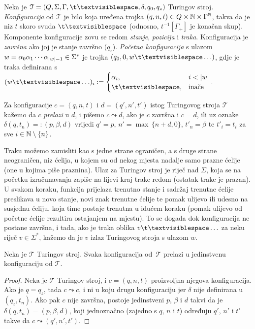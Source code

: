 \begin{definicija}[{name=[Turing-konfiguracije i prijelazi među njima]}]
Neka je $\mathcal T=(Q,\Sigma,\Gamma,\bl,\delta,q_0,q_z)$ Turingov stroj. \emph{Konfiguracija} od $\mathcal T$ je bilo koja uređena trojka $(q,n,t)\in Q\times{\mathbb N}\times\Gamma^{\mathbb N}$, takva da je niz $t$ skoro svuda $\bl$ (odnosno, $t^{-1}[\Gamma_+]$ je konačan skup). Komponente konfiguracije zovu se redom \emph{stanje}, \emph{pozicija} i \emph{traka}. Konfiguracija je \emph{završna} ako joj je stanje završno ($q_z$). \emph{Početna konfiguracija} s ulazom $w=\alpha_0\alpha_1\dotsm\alpha_{\lvert w\rvert-1}\in\Sigma^*$ je trojka $(q_0,0,w\bl\ldots)$, gdje je traka definirana s $(w\bl\ldots)_i:=\begin{cases}
\alpha_i,&i<\dulj{w}\\
\bl,&\text{inače}
\end{cases}$.

Za konfiguracije $c=(q,n,t)$ i $d=(q',n',t')$ istog Turingovog stroja $\mathcal T$ kažemo da $c$ \emph{prelazi} u $d$, i pišemo $c\leadsto d$, ako je $c$ završna i $c=d$, ili uz oznake $\delta(q,t_n)=:(p,\beta,d)$ vrijedi $q'=p$, $n'=\max\,\{n+d,0\}$, $t'_n=\beta$ te $t'_i=t_i$ za sve $i\in{\mathbb N}\setminus\{n\}$.
\end{definicija}

Traku možemo zamisliti kao s jedne strane ograničen, a s druge strane neograničen, niz ćelija, u kojem su od nekog mjesta nadalje samo prazne ćelije (one u kojima piše praznina). Ulaz za Turingov stroj je riječ nad $\Sigma$, koja se na početku izračunavanja zapiše na lijevi kraj trake redom (ostatak trake je prazan). U svakom koraku, funkcija prijelaza trenutno stanje i sadržaj trenutne ćelije preslikava u novo stanje, novi znak trenutne ćelije te pomak ulijevo ili udesno na susjednu ćeliju, koja time postaje trenutna u idućem koraku (pomak ulijevo od početne ćelije rezultira ostajanjem na mjestu). To se događa dok konfiguracija ne postane završna, i tada, ako je traka oblika $v\bl\ldots$ za neku riječ $v\in\Sigma^*$, kažemo da je $v$ izlaz Turingovog stroja s ulazom $w$.

\begin{lema}[{name=[determinističnost Turingovih strojeva]}]\label{lm:Turingdet}
Neka je $\mathcal T$ Turingov stroj. Svaka konfiguracija od \,$\mathcal T$ prelazi u jedinstvenu konfiguraciju od $\mathcal T$.
\end{lema}
\begin{proof}
Neka je $\mathcal T$ Turingov stroj, i $c=(q,n,t)$ proizvoljna njegova konfiguracija. Ako je $q=q_z$, tada $c\leadsto c$, i ni u koju drugu konfiguraciju jer $\delta$ nije definirana u $(q_z,t_n)$. Ako pak $c$ nije završna, postoje jedinstveni $p$, $\beta$ i $d$ takvi da je $\delta(q,t_n)=(p,\beta,d)$, koji jednoznačno (zajedno s $q$, $n$ i $t$) određuju $q'$, $n'$ i $t'$ takve da $c\leadsto(q',n',t')$.
\end{proof}

